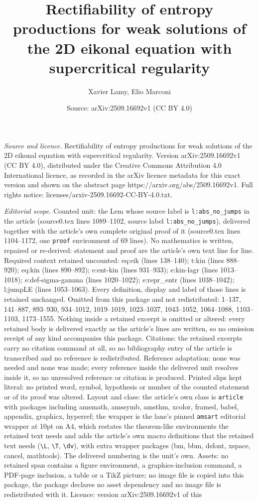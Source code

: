 \documentclass[10pt,a4paper]{amsart}
\title[Rectifiability of entropy productions for weak solutions of ]{Rectifiability of entropy productions for weak solutions of the 2D eikonal equation with supercritical regularity}
\author{Xavier Lamy, Elio Marconi}
\date{Source: arXiv:2509.16692v1 (CC BY 4.0)}
\begin{document}
\maketitle

\noindent\emph{Source and licence.} Rectifiability of entropy productions for weak solutions of the 2D eikonal equation with supercritical regularity. Version arXiv:2509.16692v1 (CC BY 4.0), distributed under the Creative Commons Attribution 4.0 International licence, as recorded in the arXiv licence metadata for this exact version and shown on the abstract page https://arxiv.org/abs/2509.16692v1. Full rights notice: licenses/arxiv-2509.16692-CC-BY-4.0.txt.\par\smallskip

\noindent\textit{Editorial scope.} Counted unit: the Lem whose source label is \texttt{l:abs\_no\_jumps} in the article (source0.tex lines 1089--1102, source label \texttt{l:abs\_no\_jumps}), delivered together with the article's own complete original proof of it (source0.tex lines 1104--1172, one \texttt{proof} environment of 69 lines). No mathematics is written, repaired or re-derived: statement and proof are the article's own text line for line. Required context retained uncounted: eq:eik (lines 138--140); t:kin (lines 888--920); eq:kin (lines 890--892); e:ent-kin (lines 931--933); e:kin-lagr (lines 1013--1018); e:def-sigma-gamma (lines 1020--1022); e:repr\_entr (lines 1038--1042); l:jumpLE (lines 1053--1063). Every definition, display and label of those lines is retained unchanged. Omitted from this package and not redistributed: 1--137, 141--887, 893--930, 934--1012, 1019--1019, 1023--1037, 1043--1052, 1064--1088, 1103--1103, 1173--1555. Nothing inside a retained excerpt is omitted or altered: every retained body is delivered exactly as the article's lines are written, so no omission receipt of any kind accompanies this package. Citations: the retained excerpts carry no citation command at all, so no bibliography entry of the article is transcribed and no reference is redistributed. Reference adaptation: none was needed and none was made; every reference inside the delivered unit resolves inside it, so no unresolved reference or citation is produced. Printed slips kept literal: no printed word, symbol, hypothesis or number of the counted statement or of its proof was altered. Layout and class: the article's own class is \texttt{article} with packages including amsmath, amssymb, amsthm, xcolor, framed, babel, appendix, graphicx, hyperref; the wrapper is the lane's pinned \texttt{amsart} editorial wrapper at 10pt on A4, which restates the theorem-like environments the retained text needs and adds the article's own macro definitions that the retained text needs (\texttt{\textbackslash L}, \texttt{\textbackslash T}, \texttt{\textbackslash dv}), with extra wrapper packages (bm, bbm, dsfont, xspace, cancel, mathtools). The delivered numbering is the unit's own. Assets: no retained span contains a figure environment, a graphics-inclusion command, a PDF-page inclusion, a table or a TikZ picture; no image file is copied into this package, the package declares no asset dependency and no image file is redistributed with it. Licence: version arXiv:2509.16692v1 of this 
\end{document}
